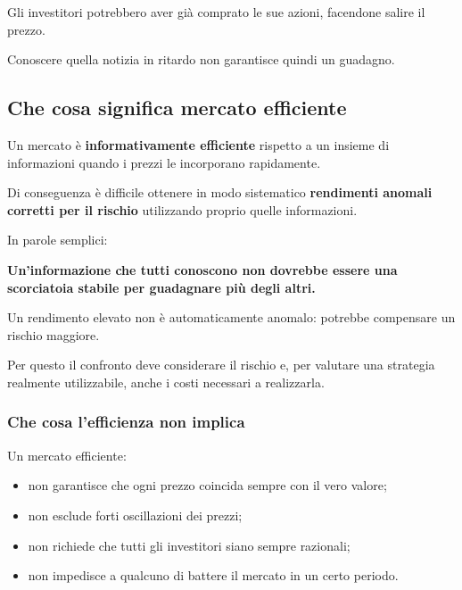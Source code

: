 \noindent Gli investitori potrebbero aver già
comprato le sue azioni, facendone salire il prezzo.

\noindent Conoscere quella notizia in ritardo
non garantisce quindi un guadagno.


\subsection{Che cosa significa mercato efficiente}

\noindent Un mercato è
\textbf{informativamente efficiente}
rispetto a un insieme di informazioni
quando i prezzi le incorporano rapidamente.

\noindent Di conseguenza è difficile ottenere
in modo sistematico
\textbf{rendimenti anomali corretti per il rischio}
utilizzando proprio quelle informazioni.

\medskip

\noindent In parole semplici:

\begin{center}
    \textbf{Un'informazione che tutti conoscono
    non dovrebbe essere una scorciatoia stabile
    per guadagnare più degli altri.}
\end{center}

\noindent Un rendimento elevato non è automaticamente
anomalo: potrebbe compensare un rischio maggiore.

\noindent Per questo il confronto deve considerare
il rischio e, per valutare una strategia realmente
utilizzabile, anche i costi necessari a realizzarla.


\subsubsection*{Che cosa l'efficienza non implica}

\noindent Un mercato efficiente:

\begin{itemize}
    \item non garantisce che ogni prezzo coincida
    sempre con il vero valore;

    \item non esclude forti oscillazioni dei prezzi;

    \item non richiede che tutti gli investitori
    siano sempre razionali;

    \item non impedisce a qualcuno di battere
    il mercato in un certo periodo.
\end{itemize}

